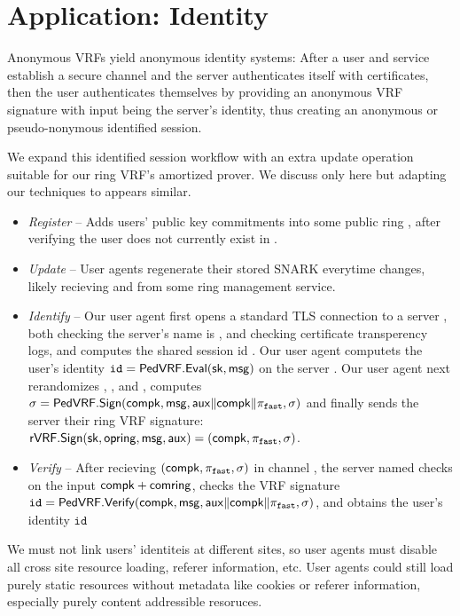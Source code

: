 \section{Application: Identity}

Anonymous VRFs yield anonymous identity systems:
After a user and service establish a secure channel and
the server authenticates itself with certificates, then
the user authenticates themselves by providing an anonymous
VRF signature with input \msg being the server's identity,
thus creating an anonymous or pseudo-nonymous identified session.

We expand this identified session workflow with an extra
update operation suitable for our ring VRF's amortized prover.
We discuss only \pifast here but adapting our techniques to \pisafe appears similar. 

\begin{itemize}
\item {\em Register} --
 Adds users' public key commitments into some public ring \ctx,
 after verifying the user does not currently exist in \ctx.
\item {\em Update} --
 User agents regenerate their stored SNARK \pifast everytime \ctx changes,
 likely recieving \comring and \openring from some ring management service.
\item {\em Identify} --
 Our user agent first opens a standard TLS connection to a server \msg,
 both checking the server's name is \msg, and checking certificate
 transperency logs, and computes the shared session id \aux.
 Our user agent computets the user's identity
  $\mathtt{id} = {\mathsf{PedVRF}}.{\mathsf{Eval}}(\mathsf{sk},\mathsf{msg})$ on the server \msg.
 Our user agent next rerandomizes \pifast, \compk, and \openpk, computes
 $\sigma = {\mathsf{PedVRF}}.{\mathsf{Sign}}(\mathsf{compk},\mathsf{msg},\mathsf{aux} \| \mathsf{compk} \| \pi_{\mathtt{fast}},\sigma)$
 and finally sends the server their ring VRF signature:
 ${\mathsf{rVRF}}.{\mathsf{Sign}}(\mathsf{sk},\mathsf{opring},\mathsf{msg},\mathsf{aux}) = (\mathsf{compk},\pi_{\mathtt{fast}},\sigma)$.
\item {\em Verify} -- 
 After recieving $(\mathsf{compk},\pi_{\mathtt{fast}},\sigma)$ in channel \aux,
 the server named \msg checks \pifast on the input $\mathsf{compk} + \mathsf{comring}$,
 checks the VRF signature
 $\mathtt{id} = {\mathsf{PedVRF}}.{\mathsf{Verify}}(\mathsf{compk},\mathsf{msg},\mathsf{aux} \| \mathsf{compk} \| \pi_{\mathtt{fast}},\sigma)$,
 and obtains the user's identity $\mathtt{id}$
\end{itemize}

We must not link users' identiteis at different sites, so user agents
must disable all cross site resource loading, referer information, etc.
User agents could still load purely static resources without metadata
like cookies or referer information, especially purely content addressible
resoruces.

